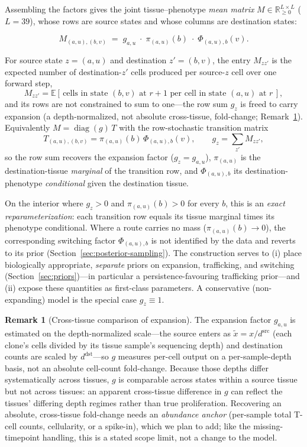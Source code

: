\documentclass[11pt]{article}
\newcommand{\Reals}{\mathbb{R}}
\newcommand{\dsrc}{d^{\mathrm{src}}}
\newcommand{\E}{\mathbb{E}}
\theoremstyle{definition}
\newtheorem*{remark}{Remark}
\begin{document}
Assembling the factors gives the joint tissue--phenotype \emph{mean matrix}
$M \in \Reals_{\geq 0}^{L\times L}$ ($L = 39$), whose rows are source states and
whose columns are destination states:

\begin{keybox}[title={Factored mean matrix}]
\[
  M_{(a,u),(b,v)}
  \;=\;
  g_{a,u}\;\cdot\;\pi_{(a,u)}(b)\;\cdot\;\Phi_{(a,u),b}(v).
\]
\end{keybox}

For source state $z=(a,u)$ and destination $z'=(b,v)$, the entry $M_{zz'}$ is the
expected number of destination-$z'$ cells produced per source-$z$ cell over one
forward step,
\[
  M_{zz'}
  =
  \E[\,\text{cells in state } (b,v) \text{ at } r+1
        \text{ per cell in state } (a,u) \text{ at } r\,],
\]
and its rows are not constrained to sum to one---the row sum $g_z$ is freed to
carry expansion (a depth-normalized, not absolute cross-tissue, fold-change;
Remark~\ref{rmk:anchor}). Equivalently
$M=\operatorname{diag}(g)\,T$ with the row-stochastic
transition matrix
\[
  T_{(a,u),(b,v)} = \pi_{(a,u)}(b)\,\Phi_{(a,u),b}(v),
  \qquad
  g_z = \sum_{z'} M_{zz'} ,
\]
so the row sum recovers the expansion factor ($g_z = g_{a,u}$), $\pi_{(a,u)}$ is the
destination-tissue \emph{marginal} of the transition row, and $\Phi_{(a,u),b}$ its
destination-phenotype \emph{conditional} given the destination tissue.

On the interior where $g_z>0$ and $\pi_{(a,u)}(b)>0$ for every $b$, this is an
\emph{exact reparameterization}: each transition row equals its tissue marginal
times its phenotype conditional. Where a route carries no mass
($\pi_{(a,u)}(b)\to 0$), the corresponding switching factor $\Phi_{(a,u),b}$ is
not identified by the data and reverts to its prior
(Section~\ref{sec:posterior-sampling}). The construction serves to (i) place
biologically appropriate, \emph{separate} priors on expansion, trafficking, and
switching (Section~\ref{sec:priors})---in particular a persistence-favouring
trafficking prior---and (ii) expose these quantities as first-class parameters.
A conservative (non-expanding) model is the special case $g_z\equiv 1$.

\begin{remark}[Cross-tissue comparison of expansion]
\label{rmk:anchor}
The expansion factor $g_{a,u}$ is estimated on the depth-normalized scale---the
source enters as $\tilde{x}=x/\dsrc$ (each clone's cells divided by its tissue
sample's sequencing depth) and destination counts are scaled by $d^{\mathrm{dst}}$---so
$g$ measures per-cell output on a per-sample-depth basis, not an absolute cell-count
fold-change. Because those depths differ systematically across tissues, $g$ is
comparable across states within a source tissue but not across tissues: an apparent
cross-tissue difference in $g$ can reflect the tissues' differing depth regimes rather
than true proliferation. Recovering an absolute, cross-tissue fold-change needs an
\emph{abundance anchor} (per-sample total T-cell counts, cellularity, or a spike-in),
which we plan to add; like the missing-timepoint handling, this is a stated scope
limit, not a change to the model.
\end{remark}
\end{document}
